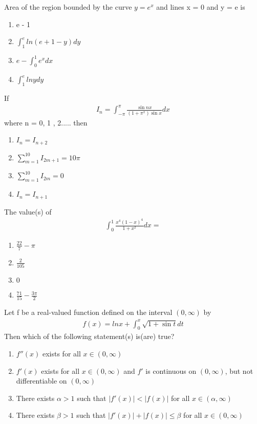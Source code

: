 \item Area of the region bounded by the curve $y = e^x$ and lines x = 0 and y = e is
\begin{enumerate}
\item e - 1
\item $\int_{1}^{e}ln(e + 1 - y)dy$
\item $e - \int_{0}^{1}e^xdx$
\item $\int_{1}^{e}ln ydy$
\end{enumerate}

\item If 
\begin{align*}
I_n = \int_{-\pi}^{\pi}\frac{\sin nx}{(1 + \pi^{x})\sin x}dx
\end{align*}
where n = 0, 1 , 2..... then
\begin{enumerate}
\item $I_n = I_{n + 2}$
\item $\sum_{m = 1}^{10}I_{2m + 1} = 10\pi$
\item $\sum_{m = 1}^{10}I_{2m} = 0$
\item $I_n = I_{n + 1}$
\end{enumerate} 

\item The value(s) of
\begin{align*}
\int_{0}^{1}\frac{x^4(1 - x)^4}{1 + x^2}dx = 
\end{align*}
\begin{enumerate}
\item $\frac{22}{7} - \pi$
\item $\frac{2}{105}$
\item $0$
\item $\frac{71}{15} - \frac{3\pi}{2}$
\end{enumerate}

\item Let f be a real-valued function defined on the interval $(0, \infty)$ by 
\begin{align*}
f(x) = lnx + \int_{0}^{x}\sqrt{1 + \sin t}dt
\end{align*}
Then which of the following statement(s) is(are) true?
\begin{enumerate}
\item $f''(x)$ exists for all $x \in (0, \infty)$
\item $f'(x)$ exists for all $x \in (0, \infty)$ and $f'$ is continuous on $(0, \infty)$, but not differentiable on $(0, \infty)$
\item There exists $\alpha > 1$ such that $|f'(x)| < |f(x)|$ for all $x \in (\alpha, \infty)$
\item There exists $\beta > 1$ such that $|f'(x)| + |f(x)| \leq \beta$ for all $x \in (0, \infty)$
\end{enumerate}

